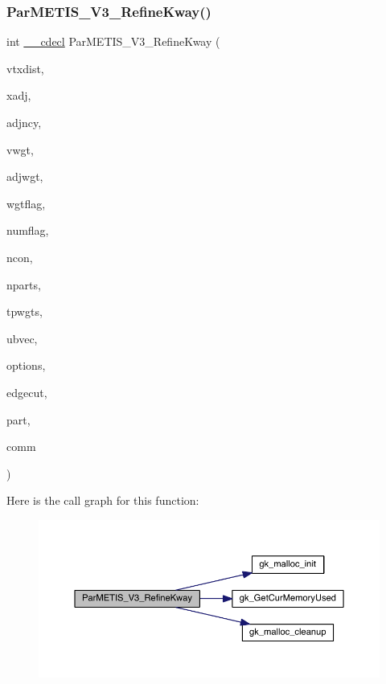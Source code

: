 \subsubsection{\texorpdfstring{Par\+M\+E\+T\+I\+S\+\_\+\+V3\+\_\+\+Refine\+Kway()}{ParMETIS\_V3\_RefineKway()}}
{\footnotesize\ttfamily int \hyperlink{a00843_a238347d7669f8f1e9c83bfe63a2730c4}{\+\_\+\+\_\+cdecl} Par\+M\+E\+T\+I\+S\+\_\+\+V3\+\_\+\+Refine\+Kway (\begin{DoxyParamCaption}\item[{\hyperlink{a00876_aaa5262be3e700770163401acb0150f52}{idx\+\_\+t} $\ast$}]{vtxdist,  }\item[{\hyperlink{a00876_aaa5262be3e700770163401acb0150f52}{idx\+\_\+t} $\ast$}]{xadj,  }\item[{\hyperlink{a00876_aaa5262be3e700770163401acb0150f52}{idx\+\_\+t} $\ast$}]{adjncy,  }\item[{\hyperlink{a00876_aaa5262be3e700770163401acb0150f52}{idx\+\_\+t} $\ast$}]{vwgt,  }\item[{\hyperlink{a00876_aaa5262be3e700770163401acb0150f52}{idx\+\_\+t} $\ast$}]{adjwgt,  }\item[{\hyperlink{a00876_aaa5262be3e700770163401acb0150f52}{idx\+\_\+t} $\ast$}]{wgtflag,  }\item[{\hyperlink{a00876_aaa5262be3e700770163401acb0150f52}{idx\+\_\+t} $\ast$}]{numflag,  }\item[{\hyperlink{a00876_aaa5262be3e700770163401acb0150f52}{idx\+\_\+t} $\ast$}]{ncon,  }\item[{\hyperlink{a00876_aaa5262be3e700770163401acb0150f52}{idx\+\_\+t} $\ast$}]{nparts,  }\item[{\hyperlink{a00876_a1924a4f6907cc3833213aba1f07fcbe9}{real\+\_\+t} $\ast$}]{tpwgts,  }\item[{\hyperlink{a00876_a1924a4f6907cc3833213aba1f07fcbe9}{real\+\_\+t} $\ast$}]{ubvec,  }\item[{\hyperlink{a00876_aaa5262be3e700770163401acb0150f52}{idx\+\_\+t} $\ast$}]{options,  }\item[{\hyperlink{a00876_aaa5262be3e700770163401acb0150f52}{idx\+\_\+t} $\ast$}]{edgecut,  }\item[{\hyperlink{a00876_aaa5262be3e700770163401acb0150f52}{idx\+\_\+t} $\ast$}]{part,  }\item[{M\+P\+I\+\_\+\+Comm $\ast$}]{comm }\end{DoxyParamCaption})}

Here is the call graph for this function\+:\nopagebreak
\begin{figure}[H]
\begin{center}
\leavevmode
\includegraphics[width=350pt]{a00843_ad40a7809c9bdf183926da011220bad75_cgraph}
\end{center}
\end{figure}

